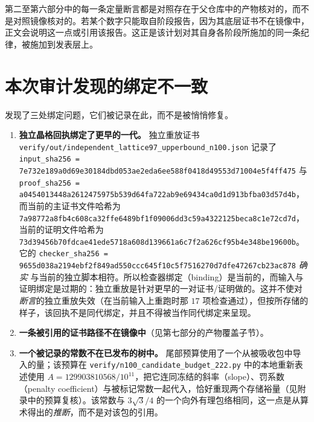 \begin{remark}[对本文档的后果]
第二至第六部分中的每一条定量断言都是对照存在于父仓库中的产物核对的，而不是对照镜像核对的。若某个数字只能取自阶段报告，因为其底层证书不在镜像中，正文会说明这一点或引用该报告。这正是该计划对其自身各阶段所施加的同一条纪律，被施加到发表层上。
\end{remark}

\section{本次审计发现的绑定不一致}

发现了三处绑定问题，它们被记录在此，而不是被悄悄修复。

\begin{enumerate}[leftmargin=1.6em,itemsep=3pt]
\item \textbf{独立晶格回执绑定了更早的一代。} 独立重放证书 {\footnotesize\texttt{verify/\allowbreak{}out/\allowbreak{}independent\_\allowbreak{}lattice97\_\allowbreak{}upperbound\_\allowbreak{}n100.json}} 记录了
{\footnotesize\texttt{input\_\allowbreak{}sha256 = 7e732e189a0d69e30184dbd053ae2eda6ee588f0418d49553d71004e5f4ff475}} 与
{\footnotesize\texttt{proof\_\allowbreak{}sha256 = a0454013448a2612475975b539d64fa722ab9e69434ca0d1d913bfba03d57d4b}}，而当前的主证书文件哈希为
{\footnotesize\texttt{7a98772a8fb4c608ca32ffe6489bf1f09006dd3c59a4322125beca8c1e72cd7d}}，当前的证明文件哈希为
{\footnotesize\texttt{73d39456b70fdcae41ede5718a608d139661a6c7f2a626cf95b4e348be19600b}}。它的
{\footnotesize\texttt{checker\_\allowbreak{}sha256 = 9655d038a2194ebf2f849ad550ccc645f10c5f7516270d7dfe47267cb23ac878}} \emph{确实}
与当前的独立脚本相符。所以检查器绑定（binding）是当前的，而输入与证明绑定是过期的：独立重放是针对更早的一对证书/证明做的。这并不使对\emph{断言}的独立重放失效（在当前输入上重跑时那 $17$ 项检查通过），但按所存储的样子，该回执不是同代绑定，并且不得被当作同代绑定来呈现。
\item \textbf{一条被引用的证书路径不在镜像中}（见第七部分的产物覆盖子节）。
\item \textbf{一个被记录的常数不在已发布的树中。} 尾部预算使用了一个从被吸收包中导入的量；该预算在
\texttt{verify/\allowbreak{}n100\_\allowbreak{}candidate\_\allowbreak{}budget\_\allowbreak{}222.py} 中的本地重新表述使用
$A=129903810568/10^{11}$，把它连同冻结的斜率（slope）、罚系数（penalty coefficient）与被标记常数一起代入，恰好重现两个存储裕量（见附录中的预算复核）。该常数与 $3\sqrt3/4$ 的一个向外有理包络相同，这一点是从算术得出的\emph{推断}，而不是对该包的引用。
\end{enumerate}

